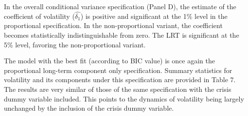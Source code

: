 \documentclass[12pt]{article}
\begin{document}
In the overall conditional variance specification (Panel D), the estimate of the coefficient of volatility ($\widehat{\delta_1}$) is positive and significant at the 1\% level in the proportional specification. In the non-proportional variant, the coefficient becomes statistically indistinguishable from zero. The LRT is significant at the 5\% level, favoring the non-proportional variant.\par
The model with the best fit (according to BIC value) is once again the proportional long-term component only specification. Summary statistics for volatility and its components under this specification are provided in Table 7. The results are very similar of those of the same specification with the crisis dummy variable included. This points to  the dynamics of volatility being largely unchanged by the inclusion of the crisis dummy variable.
\end{document}
